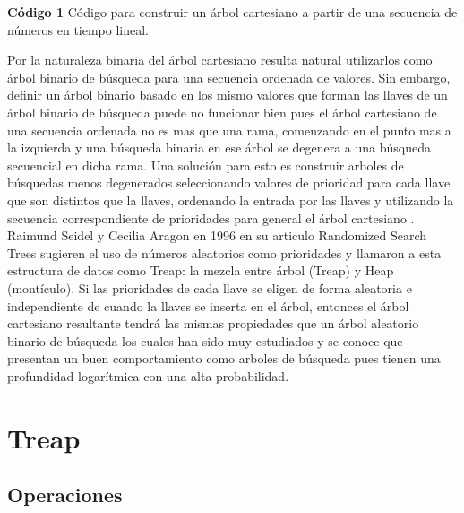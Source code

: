 \documentclass[12pt]{article}
\newcommand{\nl}{\vspace{0.3cm}}
\newcommand{\ct}{árbol cartesiano }
\begin{document}
\nl

\textbf{Código 1} Código para construir un \ct a partir de una secuencia de números en tiempo lineal.



Por la naturaleza binaria del \ct resulta natural utilizarlos como árbol binario de búsqueda para una secuencia ordenada de valores. Sin embargo, definir un árbol binario basado en los mismo valores que forman las llaves de un árbol binario de búsqueda puede no funcionar bien pues el \ct de una secuencia ordenada no es mas que una rama, comenzando en el punto mas a la izquierda y una búsqueda binaria en ese árbol se degenera a una búsqueda secuencial en dicha rama. Una solución para esto es construir arboles de búsquedas menos degenerados seleccionando valores de prioridad para cada llave que son distintos que la llaves, ordenando la entrada por las llaves y utilizando la secuencia correspondiente de prioridades para general el \ct.\\

Raimund Seidel y Cecilia Aragon en 1996 en su articulo Randomized Search Trees sugieren el uso de números aleatorios como prioridades y llamaron a esta estructura de datos como Treap: la mezcla entre árbol (Treap) y Heap (montículo). Si las prioridades de cada llave se eligen de forma aleatoria e independiente de cuando la llaves se inserta en el árbol, entonces el \ct resultante tendrá las mismas propiedades que un árbol aleatorio binario de búsqueda los cuales han sido muy estudiados y se conoce que presentan un buen comportamiento como arboles de búsqueda pues tienen una profundidad logarítmica con una alta probabilidad.

\section{Treap}

\subsection{Operaciones}
\end{document}
